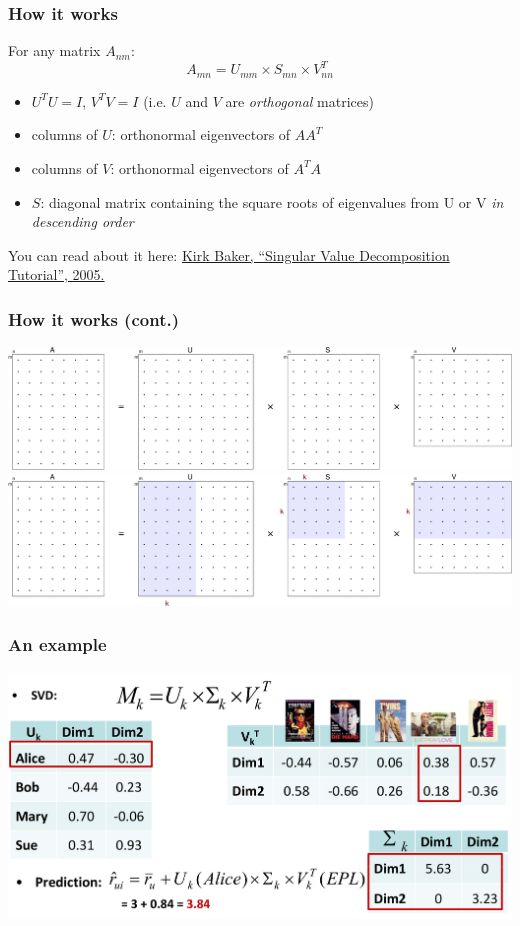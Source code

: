 \documentclass{beamer}
\begin{document}
\begin{frame}
    \frametitle{How it works}
    For any matrix $A_{nm}$:
    \begin{displaymath}
        A_{mn} = U_{mm} \times S_{mn} \times V_{nn}^T
    \end{displaymath}
    \begin{itemize}
    \item $U^TU = I$, $V^TV = I$ (i.e. $U$ and $V$ are \emph{orthogonal} matrices)
    \item columns of $U$: orthonormal eigenvectors of $AA^T$
    \item columns of $V$: orthonormal eigenvectors of $A^TA$
    \item $S$: diagonal matrix containing the square roots of eigenvalues from
        U or V \emph{in descending order}
    \end{itemize}
    \vfill
    \scriptsize You can read about it here: \href{http://www.ling.ohio-state.edu/~kbaker/pubs/Singular_Value_Decomposition_Tutorial.pdf}{Kirk Baker, ``Singular Value
      Decomposition Tutorial'', 2005.}
\end{frame}

\begin{frame}
    \frametitle{How it works (cont.)}
    \begin{overprint}
        \centering
        \includegraphics[width=\linewidth]{svdmatrix}
        \includegraphics[width=\linewidth]{svdmatrixk}
    \end{overprint}
\end{frame}

\begin{frame}
    \frametitle{An example}
    \centering
    \includegraphics[width=\linewidth]{svdalice}
\end{frame}
\end{document}
